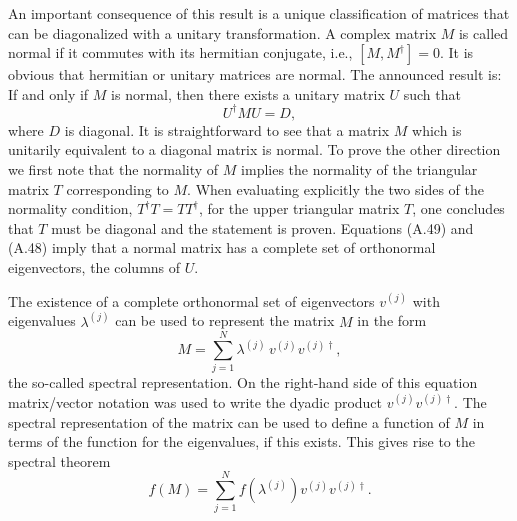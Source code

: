 An important consequence of this result is a unique classification of matrices
that can be diagonalized with a unitary transformation. A complex matrix $M$
is called normal if it commutes with its hermitian conjugate, i.e.,
$[M, M^\dagger] = 0$. It is obvious that hermitian or unitary matrices are
normal. The announced result is: If and only if $M$ is normal, then there
exists a unitary matrix $U$ such that
\begin{equation}
  U^\dagger M U = D ,
\end{equation}
where $D$ is diagonal. It is straightforward to see that a matrix $M$ which is
unitarily equivalent to a diagonal matrix is normal. To prove the other
direction we first note that the normality of $M$ implies the normality of the
triangular matrix $T$ corresponding to $M$. When evaluating explicitly the two
sides of the normality condition, $T^\dagger T = T T^\dagger$, for the upper
triangular matrix $T$, one concludes that $T$ must be diagonal and the
statement is proven. Equations (A.49) and (A.48) imply that a normal matrix
has a complete set of orthonormal eigenvectors, the columns of $U$.

The existence of a complete orthonormal set of eigenvectors $v^{(j)}$ with
eigenvalues $\lambda^{(j)}$ can be used to represent the matrix $M$ in the
form
\begin{equation}
  M = \sum_{j=1}^{N}\lambda^{(j)}\,v^{(j)}v^{(j)\dagger},
\end{equation}
the so-called spectral representation. On the right-hand side of this equation
matrix/vector notation was used to write the dyadic product
$v^{(j)}v^{(j)\dagger}$. The spectral representation of the matrix can be used
to define a function of $M$ in terms of the function for the eigenvalues, if
this exists. This gives rise to the spectral theorem
\begin{equation}
  f(M) = \sum_{j=1}^{N}f\!\left(\lambda^{(j)}\right) v^{(j)}v^{(j)\dagger}.
\end{equation}

